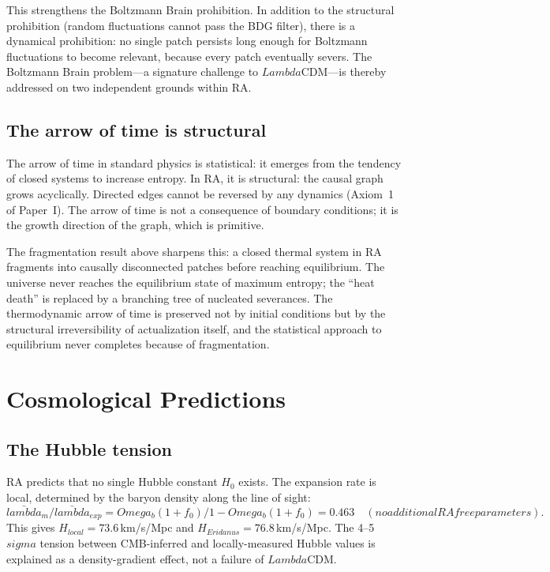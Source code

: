 \documentclass[11pt]{article}
\def\Lambda{Lambda}%
\def\Omega{Omega}%
\def\sigma{sigma}%
\def\lambda{lambda}%
\def\mathrm#1{#1}%
\def\text#1{#1}%
\def\frac#1#2{#1/#2}%
\begin{document}
This strengthens the Boltzmann Brain prohibition. In addition to the structural prohibition (random fluctuations cannot pass the BDG filter), there is a dynamical prohibition: no single patch persists long enough for Boltzmann fluctuations to become relevant, because every patch eventually severs. The Boltzmann Brain problem---a signature challenge to $\Lambda$CDM---is thereby addressed on two independent grounds within RA.

\subsection{The arrow of time is structural}
\label{sec:arrow}

The arrow of time in standard physics is statistical: it emerges from the tendency of closed systems to increase entropy. In RA, it is structural: the causal graph grows acyclically. Directed edges cannot be reversed by any dynamics (Axiom~1 of Paper~I). The arrow of time is not a consequence of boundary conditions; it is the growth direction of the graph, which is primitive.

The fragmentation result above sharpens this: a closed thermal system in RA fragments into causally disconnected patches before reaching equilibrium. The universe never reaches the equilibrium state of maximum entropy; the ``heat death'' is replaced by a branching tree of nucleated severances. The thermodynamic arrow of time is preserved not by initial conditions but by the structural irreversibility of actualization itself, and the statistical approach to equilibrium never completes because of fragmentation.

\section{Cosmological Predictions}
\label{sec:cosmology}

\subsection{The Hubble tension}

RA predicts that no single Hubble constant $H_0$ exists. The expansion rate is local, determined by the baryon density along the line of sight:
\begin{equation}
\frac{\bar{\lambda}_m}{\bar{\lambda}_{\mathrm{exp}}} = \frac{\Omega_b(1+f_0)}{1-\Omega_b(1+f_0)} = 0.463 \quad\text{(no additional RA free parameters)}.
\end{equation}
This gives $H_{\mathrm{local}}=73.6$\,km/s/Mpc and $H_{\mathrm{Eridanus}}=76.8$\,km/s/Mpc. The 4--5$\sigma$ tension between CMB-inferred and locally-measured Hubble values is explained as a density-gradient effect, not a failure of $\Lambda$CDM.
\end{document}
